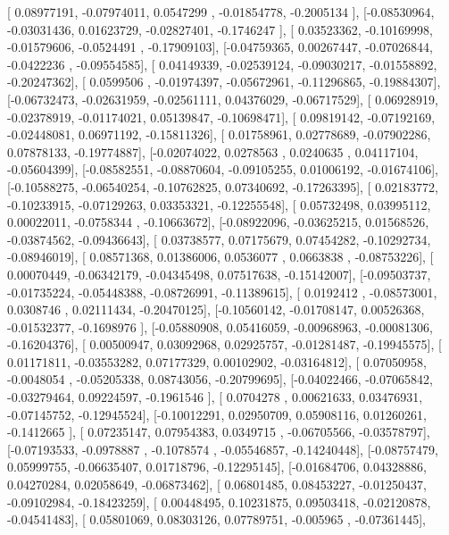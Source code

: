 \documentclass{article}
\begin{document}
       [ 0.08977191, -0.07974011,  0.0547299 , -0.01854778, -0.2005134 ],
       [-0.08530964, -0.03031436,  0.01623729, -0.02827401, -0.1746247 ],
       [ 0.03523362, -0.10169998, -0.01579606, -0.0524491 , -0.17909103],
       [-0.04759365,  0.00267447, -0.07026844, -0.0422236 , -0.09554585],
       [ 0.04149339, -0.02539124, -0.09030217, -0.01558892, -0.20247362],
       [ 0.0599506 , -0.01974397, -0.05672961, -0.11296865, -0.19884307],
       [-0.06732473, -0.02631959, -0.02561111,  0.04376029, -0.06717529],
       [ 0.06928919, -0.02378919, -0.01174021,  0.05139847, -0.10698471],
       [ 0.09819142, -0.07192169, -0.02448081,  0.06971192, -0.15811326],
       [ 0.01758961,  0.02778689, -0.07902286,  0.07878133, -0.19774887],
       [-0.02074022,  0.0278563 ,  0.0240635 ,  0.04117104, -0.05604399],
       [-0.08582551, -0.08870604, -0.09105255,  0.01006192, -0.01674106],
       [-0.10588275, -0.06540254, -0.10762825,  0.07340692, -0.17263395],
       [ 0.02183772, -0.10233915, -0.07129263,  0.03353321, -0.12255548],
       [ 0.05732498,  0.03995112,  0.00022011, -0.0758344 , -0.10663672],
       [-0.08922096, -0.03625215,  0.01568526, -0.03874562, -0.09436643],
       [ 0.03738577,  0.07175679,  0.07454282, -0.10292734, -0.08946019],
       [ 0.08571368,  0.01386006,  0.0536077 ,  0.0663838 , -0.08753226],
       [ 0.00070449, -0.06342179, -0.04345498,  0.07517638, -0.15142007],
       [-0.09503737, -0.01735224, -0.05448388, -0.08726991, -0.11389615],
       [ 0.0192412 , -0.08573001,  0.0308746 ,  0.02111434, -0.20470125],
       [-0.10560142, -0.01708147,  0.00526368, -0.01532377, -0.1698976 ],
       [-0.05880908,  0.05416059, -0.00968963, -0.00081306, -0.16204376],
       [ 0.00500947,  0.03092968,  0.02925757, -0.01281487, -0.19945575],
       [ 0.01171811, -0.03553282,  0.07177329,  0.00102902, -0.03164812],
       [ 0.07050958, -0.0048054 , -0.05205338,  0.08743056, -0.20799695],
       [-0.04022466, -0.07065842, -0.03279464,  0.09224597, -0.1961546 ],
       [ 0.0704278 ,  0.00621633,  0.03476931, -0.07145752, -0.12945524],
       [-0.10012291,  0.02950709,  0.05908116,  0.01260261, -0.1412665 ],
       [ 0.07235147,  0.07954383,  0.0349715 , -0.06705566, -0.03578797],
       [-0.07193533, -0.0978887 , -0.1078574 , -0.05546857, -0.14240448],
       [-0.08757479,  0.05999755, -0.06635407,  0.01718796, -0.12295145],
       [-0.01684706,  0.04328886,  0.04270284,  0.02058649, -0.06873462],
       [ 0.06801485,  0.08453227, -0.01250437, -0.09102984, -0.18423259],
       [ 0.00448495,  0.10231875,  0.09503418, -0.02120878, -0.04541483],
       [ 0.05801069,  0.08303126,  0.07789751, -0.005965  , -0.07361445],
\end{document}
